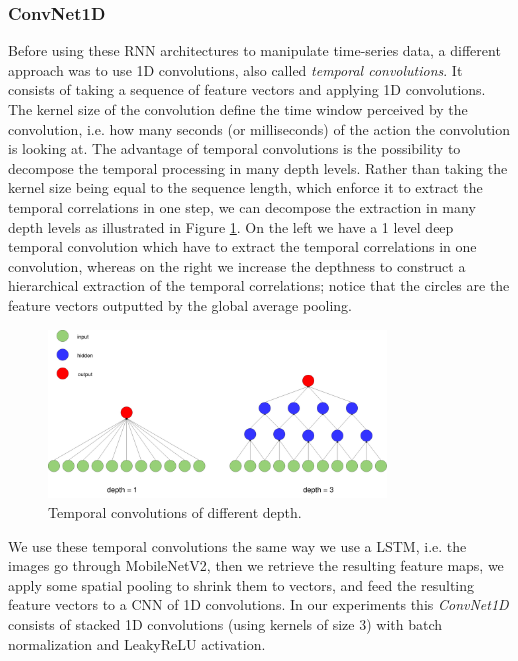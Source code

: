 \documentclass[12pt, a4paper]{report}
\begin{document}
				\subsubsection{ConvNet1D}
					Before using these RNN architectures to manipulate time-series data, a different approach was to use 1D convolutions, also called {\itshape temporal convolutions}.
					It consists of taking a sequence of feature vectors and applying 1D convolutions.
					The kernel size of the convolution define the time window perceived by the convolution, i.e. how many seconds (or milliseconds) of the action the convolution is looking at.
					The advantage of temporal convolutions is the possibility to decompose the temporal processing in many depth levels.
					Rather than taking the kernel size being equal to the sequence length, which enforce it to extract the temporal correlations in one step, we can decompose the extraction in many depth levels as illustrated in Figure \ref{temp_conv}.
					On the left we have a 1 level deep temporal convolution which have to extract the temporal correlations in one convolution, whereas on the right we increase the depthness to construct a hierarchical extraction of the temporal correlations; notice that the circles are the feature vectors outputted by the global average pooling.
					\begin{figure}[h!]
						\centering
						\includegraphics[width=0.8\textwidth]{temporal_convolution.png}
						\caption{Temporal convolutions of different depth.}\label{temp_conv}
					\end{figure}
					\par
					We use these temporal convolutions the same way we use a LSTM, i.e. the images go through MobileNetV2, then we retrieve the resulting feature maps, we apply some spatial pooling to shrink them to vectors, and feed the resulting feature vectors to a CNN of 1D convolutions.
					In our experiments this {\itshape ConvNet1D} consists of stacked 1D convolutions (using kernels of size 3) with batch normalization and LeakyReLU activation.
\end{document}
